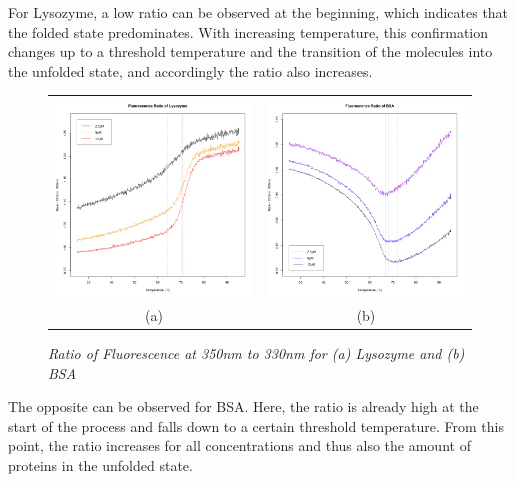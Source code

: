 \documentclass[a4paper,10pt]{article}
\begin{document}
            For Lysozyme, a low ratio can be observed at the beginning, which indicates that 
            the folded state predominates. With increasing temperature, this confirmation changes 
            up to a threshold temperature and the transition of the molecules into the unfolded state, 
            and accordingly the ratio also increases.
            \begin{figure}[H]
                \centering
                \begin{tabular}{cc}
                    \includegraphics[width=215px]{../resources/unfolding_lys_ratio.png} &
                    \includegraphics[width=215px]{../resources/unfolding_BSA_ratio.png} \\
                    (a) & (b)\\
                \end{tabular}
                \caption{\it Ratio of Fluorescence at 350nm to 330nm for (a) Lysozyme and (b) BSA}
                \label{fig:temp_ratio}
            \end{figure}
            
            The opposite can be observed for BSA. Here, the ratio is already high at the start of 
            the process and falls down to a certain threshold temperature. From this point, the ratio 
            increases for all concentrations and thus also the amount of proteins in the unfolded state.
            
\end{document}
